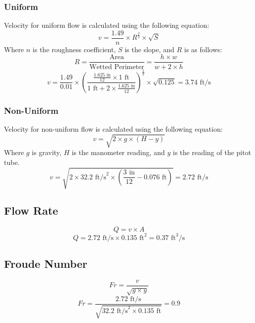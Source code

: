\documentclass{article}
\begin{document}
\subsubsection{Uniform}
\noindent Velocity for uniform flow is calculated using the following equation: 
\[v=\frac{1.49}{n}\times R^{\frac{2}{3}}\times\sqrt{S}\] 
Where $n$ is the roughness coefficient, $S$ is the slope, and $R$ is as follows: 
\[R=\frac{\text{Area}}{\text{Wetted Perimeter}}=\frac{h\times w}{w+2\times h}\]
\[v=\frac{1.49}{0.01}\times\left(\frac{\frac{1.625\text{ in}}{12}\times1\text{ ft}}{1\text{ ft}+2\times\frac{1.625\text{ in}}{12}}\right)^\frac{2}{3}\times\sqrt{0.125}=\boxed{3.74\text{ ft/s}}\]
\subsubsection{Non-Uniform}
\noindent Velocity for non-uniform flow is calculated using the following equation: 
\[v=\sqrt{2\times g\times (H-y)}\] 
Where $g$ is gravity, $H$ is the manometer reading, and $y$ is the reading of the pitot tube.
\[v=\sqrt{2\times 32.2\text{ ft/s}^2\times \left(\frac{3\text{ in}}{12}-0.076\text{ ft}\right)}=\boxed{2.72\text{ ft/s}}\] 
\subsection{Flow Rate}
\[Q=v\times A\] 
\[Q=2.72\text{ ft/s}\times 0.135\text{ ft}^2=\boxed{0.37\text{ ft}^3\text{/s}}\]
\subsection{Froude Number}
\[Fr=\frac{v}{\sqrt{g\times y}}\]
\[Fr=\frac{2.72\text{ ft/s}}{\sqrt{32.2\text{ ft/s}^2\times0.135\text{ ft}}}=\boxed{0.9}\]
\doublespacing
\newpage
\end{document}
